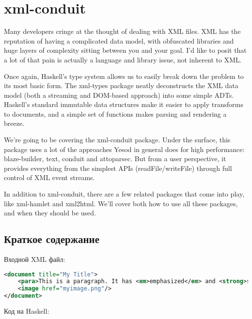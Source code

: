 \chapter{xml-conduit}

Many developers cringe at the thought of dealing with XML files. XML has the reputation of having a complicated data model, with obfuscated libraries and huge layers of complexity sitting between you and your goal. I'd like to posit that a lot of that pain is actually a language and library issue, not inherent to XML.

Once again, Haskell's type system allows us to easily break down the problem to its most basic form. The xml-types package neatly deconstructs the XML data model (both a streaming and DOM-based approach) into some simple ADTs. Haskell's standard immutable data structures make it easier to apply transforms to documents, and a simple set of functions makes parsing and rendering a breeze.

We're going to be covering the xml-conduit package. Under the surface, this package uses a lot of the approaches Yesod in general does for high performance: blaze-builder, text, conduit and attoparsec. But from a user perspective, it provides everything from the simplest APIs (readFile/writeFile) through full control of XML event streams.

In addition to xml-conduit, there are a few related packages that come into play, like xml-hamlet and xml2html. We'll cover both how to use all these packages, and when they should be used.

\section{Краткое содержание} %

Входной XML файл:

\begin{lstlisting}[language=XML]
<document title="My Title">
    <para>This is a paragraph. It has <em>emphasized</em> and <strong>strong</strong> words.</para>
    <image href="myimage.png"/>
</document>
\end{lstlisting}

Код на Haskell:

